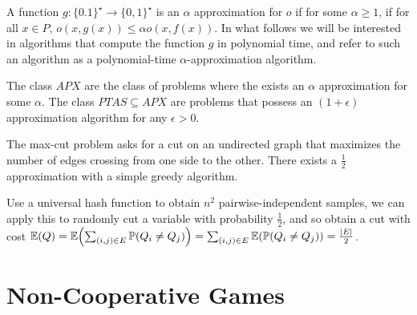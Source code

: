 \begin{defn}
  A function $g: \{ 0. 1 \}^{\star} \rightarrow \{ 0, 1 \}^{\star}$ is
  an $\alpha$ approximation for $o$ if for some $\alpha \geq 1$, if
  for all $x \in P$, $o(x, g(x)) \leq \alpha o(x, f(x))$. In what
  follows we will be interested in algorithms that compute the
  function $g$ in polynomial time, and refer to such an algorithm as a
  polynomial-time $\alpha$-approximation
  algorithm.\label{sec:appr-algor-1}

  The class $APX$ are the class of problems where the exists an
  $\alpha$ approximation for some $\alpha$.  The class $PTAS \subseteq
  APX$ are problems that possess an $(1 + \epsilon)$ approximation
  algorithm for any $\epsilon > 0$.
\end{defn}

\begin{thm}
  \label{sec:appr-algor-2}
  The max-cut problem asks for a cut on an undirected graph that
  maximizes the number of edges crossing from one side to the other.
  There exists a $\frac{1}{2}$ approximation with a simple greedy
  algorithm.

  Use a universal hash function to obtain $n^{2}$ pairwise-independent
  samples, we can apply this to randomly cut a variable with
  probability $\frac{1}{2}$, and so obtain a cut with cost $\E{Q} =
  \E{\sum_{(i, j) \in E}^{} \Prob{Q_{i} \neq Q_{j}}} = \sum_{(i, j)
    \in E}^{} \E{\Prob{Q_{i} \neq Q_{j}}} = \frac{|E|}{2}$.
\end{thm}

\section{Non-Cooperative Games}
\label{sec:non-coop-games}

